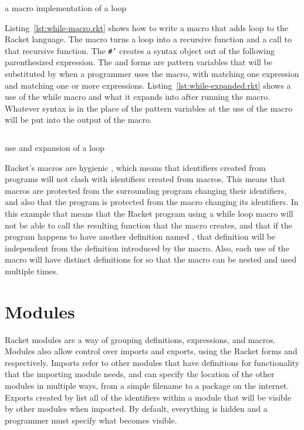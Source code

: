 \begin{listing}[tb]
  \inputminted{racket}{listings/while-macro.rkt}
  \caption{a macro implementation of a  loop}
  \label{lst:while-macro.rkt}
\end{listing}
Listing~\ref{lst:while-macro.rkt} shows how to write a macro that adds  loop to the Racket language. 
The macro turns a  loop into a recursive function and a call to that recursive function.
The \texttt{#'} creates a syntax object out of the following parenthesized expression. 
The  and  forms are pattern variables that will be substituted by  when a programmer uses the macro, with  matching one expression and  matching one or more expressions.
Listing~\ref{lst:while-expanded.rkt} shows a use of the while macro and what it expands into after running the macro. 
Whatever syntax is in the place of the pattern variables at the use of the macro will be put into the output of the macro.
\begin{listing}[tb]
  \inputminted{racket}{listings/while-expanded.rkt}
  \caption{use and expansion of a  loop}
  \label{lst:while-expanded.rkt}
\end{listing}

Racket's macros are hygienic \cite{hygiene}, which means that identifiers created from programs will not clash with identifiers created from macros. 
This means that macros are protected from the surrounding program changing their identifiers, and also that the program is protected from the macro changing its identifiers.
In this example that means that the Racket program using a while loop macro will not be able to call the resulting  function that the macro creates, and that if the program happens to have another definition named , that definition will be independent from the definition introduced by the macro.
Also, each use of the macro will have distinct definitions for  so that the macro can be nested and used multiple times.

\section{Modules}
Racket modules are a way of grouping definitions, expressions, and macros. 
Modules also allow control over imports and exports, using the Racket forms  and  respectively.
Imports refer to other modules that have definitions for functionality that the importing module needs, and can specify the location of the other modules in multiple ways, from a simple filename to a package on the internet. 
Exports created by  list all of the identifiers within a module that will be visible by other modules when imported. 
By default, everything is hidden and a programmer must specify what becomes visible.

